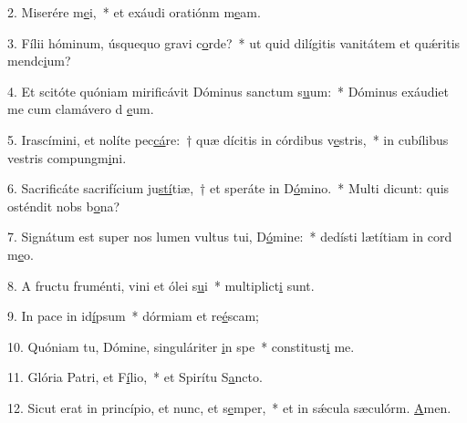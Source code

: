 2. Miserére m\uline{e}i,~* et exáudi oratiónm m\uline{e}am.\par 
3. Fílii hóminum, úsquequo gravi c\uline{o}rde?~* ut quid dilígitis vanitátem et quǽritis mendc\uline{i}um?\par 
4. Et scitóte quóniam mirificávit Dóminus sanctum s\uline{u}um:~* Dóminus exáudiet me cum clamávero d \uline{e}um.\par 
5. Irascímini, et nolíte pec\uline{cá}re:~† quæ dícitis in córdibus v\uline{e}stris,~* in cubílibus vestris compungm\uline{i}ni.\par 
6. Sacrificáte sacrifícium ju\uline{stí}tiæ,~† et speráte in D\uline{ó}mino.~* Multi dicunt: quis osténdit nobs b\uline{o}na?\par 
7. Signátum est super nos lumen vultus tui, D\uline{ó}mine:~* dedísti lætítiam in cord m\uline{e}o.\par 
8. A fructu fruménti, vini et ólei s\uline{u}i~* multiplict\uline{i} sunt.\par 
9. In pace in id\uline{í}psum~* dórmiam et re\uline{é}scam;\par 
10. Quóniam tu, Dómine, singuláriter \uline{i}n spe~* constitust\uline{i} me.\par 
11. Glória Patri, et F\uline{í}lio,~* et Spirítu S\uline{a}ncto.\par 
12. Sicut erat in princípio, et nunc, et s\uline{e}mper,~* et in sǽcula sæculórm. \uline{A}men.\par 
